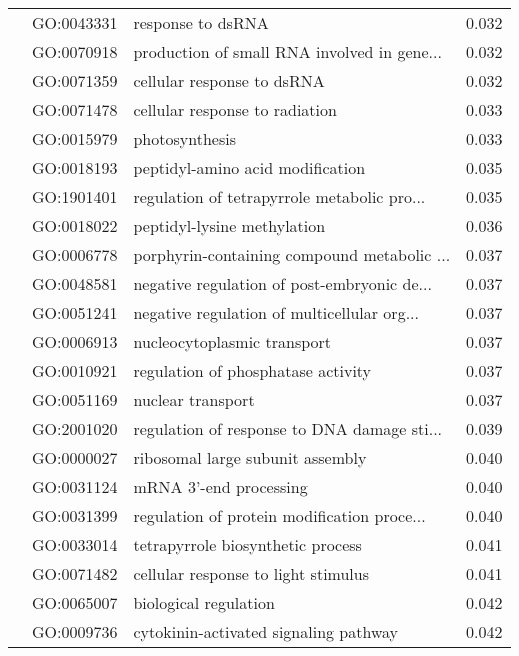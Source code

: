 \begin{longtable}{lllr}
   & GO:0043331 &                            response to dsRNA &         0.032 \\
   & GO:0070918 &  production of small RNA involved in gene... &         0.032 \\
   & GO:0071359 &                   cellular response to dsRNA &         0.032 \\
   & GO:0071478 &               cellular response to radiation &         0.033 \\
   & GO:0015979 &                               photosynthesis &         0.033 \\
   & GO:0018193 &             peptidyl-amino acid modification &         0.035 \\
   & GO:1901401 &  regulation of tetrapyrrole metabolic pro... &         0.035 \\
   & GO:0018022 &                  peptidyl-lysine methylation &         0.036 \\
   & GO:0006778 &  porphyrin-containing compound metabolic ... &         0.037 \\
   & GO:0048581 &  negative regulation of post-embryonic de... &         0.037 \\
   & GO:0051241 &  negative regulation of multicellular org... &         0.037 \\
   & GO:0006913 &                  nucleocytoplasmic transport &         0.037 \\
   & GO:0010921 &           regulation of phosphatase activity &         0.037 \\
   & GO:0051169 &                            nuclear transport &         0.037 \\
   & GO:2001020 &  regulation of response to DNA damage sti... &         0.039 \\
   & GO:0000027 &             ribosomal large subunit assembly &         0.040 \\
   & GO:0031124 &                       mRNA 3'-end processing &         0.040 \\
   & GO:0031399 &  regulation of protein modification proce... &         0.040 \\
   & GO:0033014 &            tetrapyrrole biosynthetic process &         0.041 \\
   & GO:0071482 &          cellular response to light stimulus &         0.041 \\
   & GO:0065007 &                        biological regulation &         0.042 \\
   & GO:0009736 &        cytokinin-activated signaling pathway &         0.042 \\

\end{longtable}
